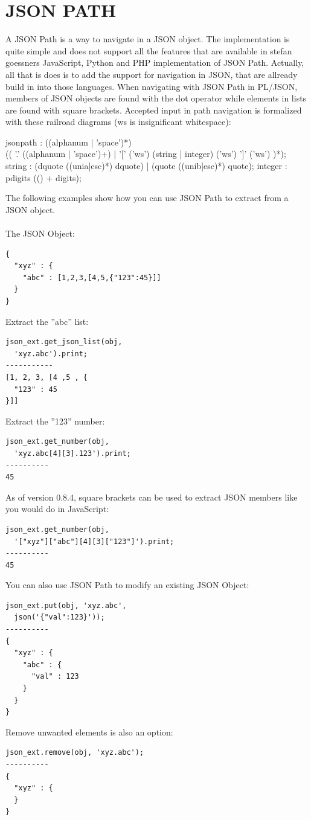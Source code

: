 \documentclass[11pt,a4paper]{article}
\begin{document}
\section{JSON PATH}
A JSON Path is a way to navigate in a JSON object. The implementation is quite simple and does not support all the features that are available in stefan goessners JavaScript, Python and PHP implementation of JSON Path. Actually, all that is does is to add the support for navigation in JSON, that are allready build in into those languages. When navigating with JSON Path in PL/JSON, members of JSON objects are found with the dot operator while elements in lists are found with square brackets. Accepted input in path navigation is formalized with these railroad diagrams (ws is insignificant whitespace):
\begin{rail}
jsonpath : ((alphanum | 'space')*) \\(( '.' ((alphanum | 'space')+) | '[' ('ws') (string | integer) ('ws') ']' ('ws') )*);
string   : (dquote ((unia|esc)*) dquote) | (quote ((unib|esc)*) quote);
integer  : pdigits (() + digits);
\end{rail}
The following examples show how you can use JSON Path to extract from a JSON object.\\\\
The JSON Object:
\begin{verbatim}
{
  "xyz" : {
    "abc" : [1,2,3,[4,5,{"123":45}]]
  }
}
\end{verbatim}
Extract the ''abc'' list:
\begin{verbatim}
json_ext.get_json_list(obj, 
  'xyz.abc').print;
-----------
[1, 2, 3, [4 ,5 , {
  "123" : 45
}]]
\end{verbatim}
Extract the ''123'' number:
\begin{verbatim}
json_ext.get_number(obj,
  'xyz.abc[4][3].123').print;
----------
45
\end{verbatim}
As of version 0.8.4, square brackets can be used to extract JSON members like you would do in JavaScript: 
\begin{verbatim}
json_ext.get_number(obj,
  '["xyz"]["abc"][4][3]["123"]').print;
----------
45
\end{verbatim}
You can also use JSON Path to modify an existing JSON Object:
\begin{verbatim}
json_ext.put(obj, 'xyz.abc',
  json('{"val":123}'));
----------
{
  "xyz" : {
    "abc" : {
      "val" : 123
    }
  }
}
\end{verbatim}
Remove unwanted elements is also an option:
\begin{verbatim}
json_ext.remove(obj, 'xyz.abc');
----------
{
  "xyz" : {
  }
}
\end{verbatim}
\end{document}
